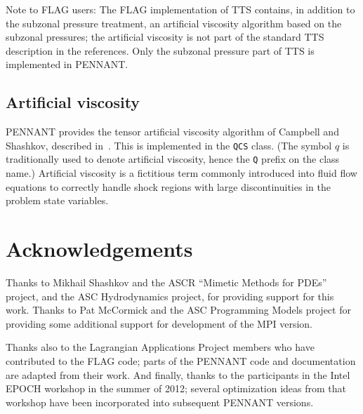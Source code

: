 \documentclass[11pt,letterpaper]{article}
\begin{document}
Note to FLAG users:  The FLAG implementation of TTS contains, in addition
to the subzonal pressure treatment, an artificial viscosity algorithm
based on the subzonal pressures; the artificial viscosity is not part of
the standard TTS description in the references.  Only the subzonal pressure
part of TTS is implemented in PENNANT.

\subsection{Artificial viscosity}

PENNANT provides the tensor artificial viscosity algorithm of Campbell and
Shashkov, described in~\cite{qcs}.  This is implemented in the {\tt QCS}
class.  (The symbol $q$ is traditionally used to denote artificial
viscosity, hence the {\tt Q} prefix on the class name.)
Artificial viscosity is a fictitious term commonly introduced into
fluid flow equations to correctly handle
shock regions with large discontinuities in
the problem state variables.


\section*{Acknowledgements}

Thanks to Mikhail Shashkov and the ASCR ``Mimetic Methods for PDEs''
project, and the ASC Hydrodynamics project, for providing support for
this work.  Thanks to Pat McCormick and the ASC Programming Models
project for providing some additional support for development of the
MPI version.

Thanks also to the Lagrangian Applications Project members who have
contributed to the FLAG code; parts of the PENNANT code and documentation
are adapted from their work.
And finally, thanks to the participants in the Intel EPOCH workshop
in the summer of 2012; several optimization ideas from that workshop
have been incorporated into subsequent PENNANT versions.
\end{document}
